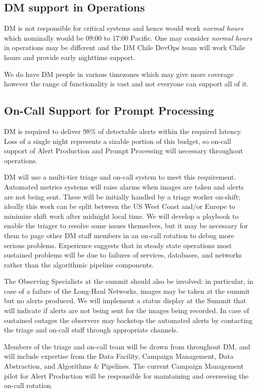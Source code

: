 \subsection{DM support in Operations} \label{sec:support}
DM is not responsible for critical systems and hence would work \emph{normal hours} which nominally would be 09:00 to 17:00 Pacific.
One may consider \emph{normal hours} in operations may be different and the DM Chile DevOps team will work Chile hours and provide early nighttime support.

We do have DM people in various timezones which may give more coverage however the range of functionality is vast and not everyone can support all of it.

\subsection{On-Call Support for Prompt Processing}

DM is required  to deliver 98\% of detectable alerts within the required latency.  
Loss of a single night represents a sizable portion of this budget, so on-call support of Alert Production and Prompt Processing will necessary throughout operations.

DM will use a multi-tier triage and on-call system to meet this requirement. 
Automated metrics systems will raise alarms when images are taken and alerts are not being sent.
These will be initially handled by a triage worker on-shift; ideally this work can be split between the US West Coast and/or Europe to minimize shift work after midnight local time.
We will develop a playbook to enable the triager to resolve some issues themselves, but it may be necessary for them to page other DM staff members in an on-call rotation to debug more serious problems.  
Experience suggests that in steady state operations most sustained problems will be due to failures of services, databases, and networks rather than the algorithmic pipeline components.

The Observing Specialists at the summit should also be involved: in particular, in case of a failure of the Long-Haul Networks, images may be taken at the summit but no alerts produced. 
We will implement a status display at the Summit that will indicate if alerts are not being sent for the images being recorded.
In case of sustained outages the observers may backstop the automated alerts by contacting the triage and on-call staff through appropriate channels.

Members of the triage and on-call team will be drawn from throughout DM, and will include expertise from the Data Facility, Campaign Management, Data Abstraction, and Algorithms \& Pipelines.
The current Campaign Management pilot for Alert Production will be responsible for maintaining and overseeing the on-call rotation.

